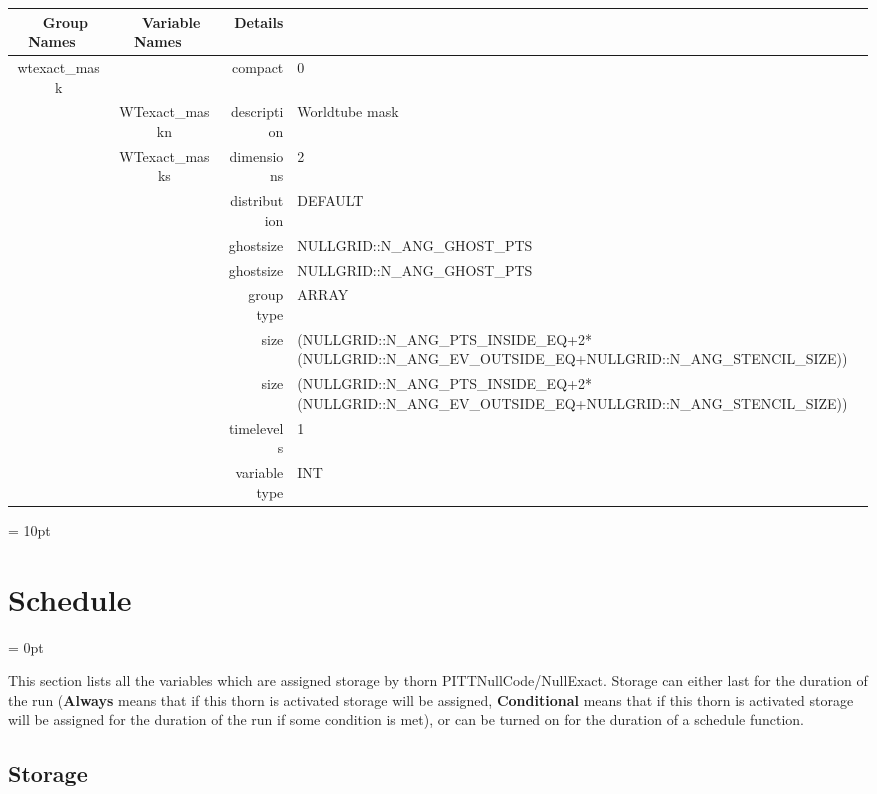 \begin{tabular*}{150mm}{|c|c@{\extracolsep{\fill}}|rl|} \hline 
~ {\bf Group Names} ~ & ~ {\bf Variable Names} ~  &{\bf Details} ~ & ~ \\ 
\hline 
wtexact\_mask &  & compact & 0 \\ 
 & WTexact\_maskn & description & Worldtube mask \\ 
 & WTexact\_masks & dimensions & 2 \\ 
 &  & distribution & DEFAULT \\ 
 &  & ghostsize & NULLGRID::N\_ANG\_GHOST\_PTS \\ 
& ~ & ghostsize & NULLGRID::N\_ANG\_GHOST\_PTS \\ 
 &  & group type & ARRAY \\ 
 &  & size & (NULLGRID::N\_ANG\_PTS\_INSIDE\_EQ+2*(NULLGRID::N\_ANG\_EV\_OUTSIDE\_EQ+NULLGRID::N\_ANG\_STENCIL\_SIZE)) \\ 
& ~ & size & (NULLGRID::N\_ANG\_PTS\_INSIDE\_EQ+2*(NULLGRID::N\_ANG\_EV\_OUTSIDE\_EQ+NULLGRID::N\_ANG\_STENCIL\_SIZE)) \\ 
 &  & timelevels & 1 \\ 
 &  & variable type & INT \\ 
\hline 
\end{tabular*} 



\vspace{5mm}\parskip = 10pt 

\section{Schedule} 


\parskip = 0pt


\noindent This section lists all the variables which are assigned storage by thorn PITTNullCode/NullExact.  Storage can either last for the duration of the run ({\bf Always} means that if this thorn is activated storage will be assigned, {\bf Conditional} means that if this thorn is activated storage will be assigned for the duration of the run if some condition is met), or can be turned on for the duration of a schedule function.


\subsection*{Storage}

\hspace{5mm}

